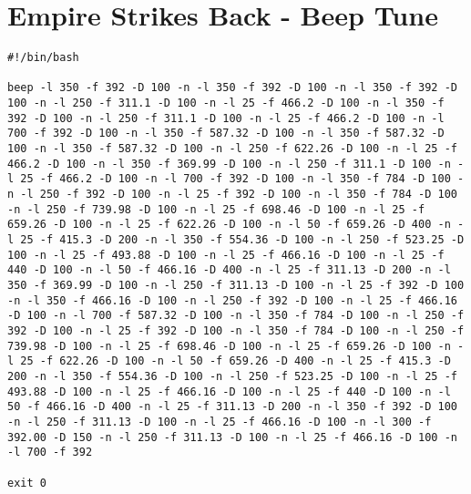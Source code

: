 \chapter{Empire Strikes Back - Beep Tune}

\begin{lstlisting}
#!/bin/bash

beep -l 350 -f 392 -D 100 -n -l 350 -f 392 -D 100 -n -l 350 -f 392 -D 100 -n -l 250 -f 311.1 -D 100 -n -l 25 -f 466.2 -D 100 -n -l 350 -f 392 -D 100 -n -l 250 -f 311.1 -D 100 -n -l 25 -f 466.2 -D 100 -n -l 700 -f 392 -D 100 -n -l 350 -f 587.32 -D 100 -n -l 350 -f 587.32 -D 100 -n -l 350 -f 587.32 -D 100 -n -l 250 -f 622.26 -D 100 -n -l 25 -f 466.2 -D 100 -n -l 350 -f 369.99 -D 100 -n -l 250 -f 311.1 -D 100 -n -l 25 -f 466.2 -D 100 -n -l 700 -f 392 -D 100 -n -l 350 -f 784 -D 100 -n -l 250 -f 392 -D 100 -n -l 25 -f 392 -D 100 -n -l 350 -f 784 -D 100 -n -l 250 -f 739.98 -D 100 -n -l 25 -f 698.46 -D 100 -n -l 25 -f 659.26 -D 100 -n -l 25 -f 622.26 -D 100 -n -l 50 -f 659.26 -D 400 -n -l 25 -f 415.3 -D 200 -n -l 350 -f 554.36 -D 100 -n -l 250 -f 523.25 -D 100 -n -l 25 -f 493.88 -D 100 -n -l 25 -f 466.16 -D 100 -n -l 25 -f 440 -D 100 -n -l 50 -f 466.16 -D 400 -n -l 25 -f 311.13 -D 200 -n -l 350 -f 369.99 -D 100 -n -l 250 -f 311.13 -D 100 -n -l 25 -f 392 -D 100 -n -l 350 -f 466.16 -D 100 -n -l 250 -f 392 -D 100 -n -l 25 -f 466.16 -D 100 -n -l 700 -f 587.32 -D 100 -n -l 350 -f 784 -D 100 -n -l 250 -f 392 -D 100 -n -l 25 -f 392 -D 100 -n -l 350 -f 784 -D 100 -n -l 250 -f 739.98 -D 100 -n -l 25 -f 698.46 -D 100 -n -l 25 -f 659.26 -D 100 -n -l 25 -f 622.26 -D 100 -n -l 50 -f 659.26 -D 400 -n -l 25 -f 415.3 -D 200 -n -l 350 -f 554.36 -D 100 -n -l 250 -f 523.25 -D 100 -n -l 25 -f 493.88 -D 100 -n -l 25 -f 466.16 -D 100 -n -l 25 -f 440 -D 100 -n -l 50 -f 466.16 -D 400 -n -l 25 -f 311.13 -D 200 -n -l 350 -f 392 -D 100 -n -l 250 -f 311.13 -D 100 -n -l 25 -f 466.16 -D 100 -n -l 300 -f 392.00 -D 150 -n -l 250 -f 311.13 -D 100 -n -l 25 -f 466.16 -D 100 -n -l 700 -f 392

exit 0
\end{lstlisting}
